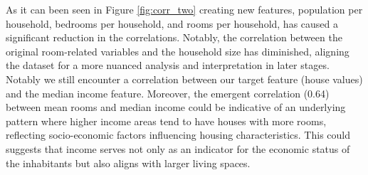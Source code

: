\documentclass[12pt]{article}
\begin{document}
As it can been seen in Figure \ref{fig:corr_two} creating new features, population per household, bedrooms per household, and rooms per household, has caused a significant reduction in the correlations. Notably, the correlation between the original room-related variables and the household size has diminished, aligning the dataset for a more nuanced analysis and interpretation in later stages.
Notably we still encounter a correlation between our target feature (house values) and the median income feature. Moreover, the emergent correlation (0.64) between mean rooms and median income could be indicative of an underlying pattern where higher income areas tend to have houses with more rooms, reflecting socio-economic factors influencing housing characteristics. This could suggests that  income serves not only as an indicator for the economic status of the inhabitants but also aligns with larger living spaces.
\end{document}
